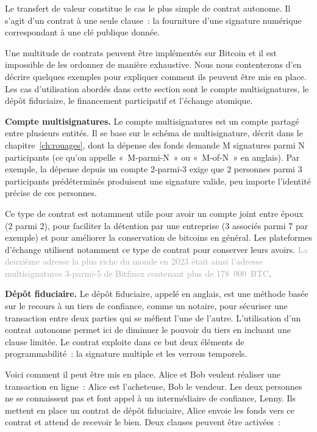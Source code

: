 Le transfert de valeur constitue le cas le plus simple de contrat autonome. Il s'agit d'un contrat à une seule clause~: la fourniture d'une signature numérique correspondant à une clé publique donnée.

Une multitude de contrats peuvent être implémentés sur Bitcoin et il est impossible de les ordonner de manière exhaustive. Nous nous contenterons d'en décrire quelques exemples pour expliquer comment ils peuvent être mis en place. Les cas d'utilisation abordés dans cette section sont le compte multisignatures, le dépôt fiduciaire, le financement participatif et l'échange atomique.


\textbf{Compte multisignatures.} Le compte multisignatures est un compte partagé entre plusieurs entités. Il se base sur le schéma de multisignature, décrit dans le chapitre~\ref{ch:rouages}, dont la dépense des fonds demande M signatures parmi N participants (ce qu'on appelle «~M-parmi-N~» ou «~M-of-N~» en anglais). Par exemple, la dépense depuis un compte 2-parmi-3 exige que 2 personnes parmi 3 participants prédéterminés produisent une signature valide, peu importe l'identité précise de ces personnes.

Ce type de contrat est notamment utile pour avoir un compte joint entre époux (2 parmi 2), pour faciliter la détention par une entreprise (3 associés parmi 7 par exemple) et pour améliorer la conservation de bitcoins en général. Les plateformes d'échange utilisent notamment ce type de contrat pour conserver leurs avoirs. \textcolor{darkgray}{La deuxième adresse la plus riche du monde en 2023 était ainsi l'adresse multisignatures 3-parmi-5 de Bitfinex contenant plus de 178~000~BTC}.


\textbf{Dépôt fiduciaire.} Le dépôt fiduciaire, appelé  en anglais, est une méthode basée sur le recours à un tiers de confiance, comme un notaire, pour sécuriser une transaction entre deux parties qui se méfient l'une de l'autre. L'utilisation d'un contrat autonome permet ici de diminuer le pouvoir du tiers en incluant une clause limitée. Le contrat exploite dans ce but deux éléments de programmabilité~: la signature multiple et les verrous temporels.

Voici comment il peut être mis en place. Alice et Bob veulent réaliser une transaction en ligne~: Alice est l'acheteuse, Bob le vendeur. Les deux personnes ne se connaissent pas et font appel à un intermédiaire de confiance, Lenny. Ils mettent en place un contrat de dépôt fiduciaire, Alice envoie les fonds vers ce contrat et attend de recevoir le bien. Deux clauses peuvent être activées~:

